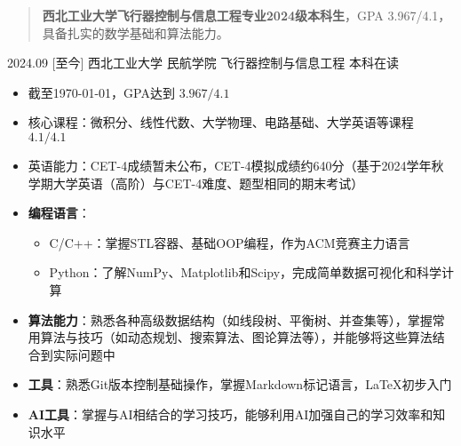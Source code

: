 \documentclass[zh]{resume}
\begin{document}
\makeheader

\begin{abstract}
\textbf{西北工业大学飞行器控制与信息工程专业2024级本科生}，GPA 3.967/4.1，具备扎实的数学基础和算法能力。
\end{abstract}

\begin{educations}
  \education%
    {2024.09}%
    [至今]%
    {西北工业大学}%
    {民航学院}%
    {飞行器控制与信息工程}%
    {本科在读}
\end{educations}

\begin{itemize}
  \item 截至\today，GPA达到 \(3.967/4.1\)
  \item 核心课程：微积分、线性代数、大学物理、电路基础、大学英语等课程 \(4.1/4.1\)
  \item 英语能力：CET-4成绩暂未公布，CET-4模拟成绩约640分（基于2024学年秋学期大学英语（高阶）与CET-4难度、题型相同的期末考试）
\end{itemize}

\begin{itemize}
  \item \textbf{编程语言}：
    \begin{itemize}
      \item C/C++：掌握STL容器、基础OOP编程，作为ACM竞赛主力语言
      \item Python：了解NumPy、Matplotlib和Scipy，完成简单数据可视化和科学计算
    \end{itemize}
  \item \textbf{算法能力}：熟悉各种高级数据结构（如线段树、平衡树、并查集等），掌握常用算法与技巧（如动态规划、搜索算法、图论算法等），并能够将这些算法结合到实际问题中
  \item \textbf{工具}：熟悉Git版本控制基础操作，掌握Markdown标记语言，\LaTeX 初步入门
  \item \textbf{AI工具}：掌握与AI相结合的学习技巧，能够利用AI加强自己的学习效率和知识水平
\end{itemize}
\end{document}
